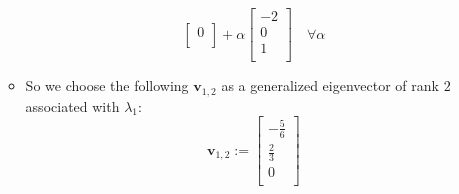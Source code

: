 \documentclass[12pt,a4paper]{article}
\begin{document}
\begin{itemize}
\begin{itemize}
\begin{equation}
\begin{bmatrix}
        0 \\
      \end{bmatrix}
      +
      \alpha
      \begin{bmatrix}
        -2 \\
        0 \\
        1 \\
      \end{bmatrix}
      \quad \forall \alpha
    \end{equation}
  \item So we choose the following $\bm{v}_{1,2}$ as a generalized eigenvector of rank $2$ associated with $\lambda_{1}$:
    \begin{equation}\nonumber%
      \bm{v}_{1,2} := 
      \begin{bmatrix}
        -\frac{5}{6} \\
        \frac{2}{3} \\
        0 \\
      \end{bmatrix}
    \end{equation}


\end{itemize}
\end{itemize}
\end{document}
